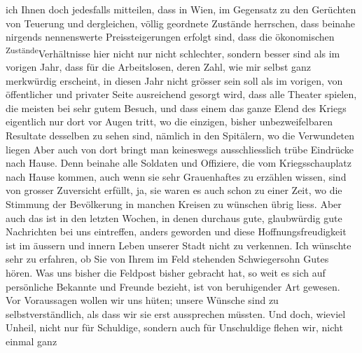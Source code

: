 \begin{ledgroupsized}[t]{13cm}
                    ich Ihnen doch jedesfalls mitteilen, dass in Wien, im Gegensatz zu den Gerüchten von Teuerung und dergleichen,
                    völlig geordnete Zustände herrschen, dass beinahe nirgends nennenswerte
                    Preissteigerungen erfolgt sind, dass die ökonomischen \substVorne{}\textsuperscript{Zustände}{\allowbreak}\substDazwischen{}Verhältnisse\substHinten{} hier nicht nur nicht schlechter, sondern besser sind als im vorigen
                    Jahr, dass für die Arbeitslosen, deren Zahl, wie mir selbst ganz merkwürdig
                    erscheint, in diesen Jahr nicht grösser sein soll als im vorigen, von
                    öffentlicher und privater Seite ausreichend {\pb}gesorgt wird, dass alle Theater spielen, die meisten bei sehr gutem Besuch,
                    und dass einem das ganze Elend des Kriegs eigentlich nur dort vor Augen tritt,
                    wo die einzigen, bisher unbezweifelbaren Resultate desselben zu sehen sind,
                    nämlich in den Spitälern, wo die Verwundeten liegen{\dotstwo}
                    Aber auch von dort bringt man keineswegs ausschliesslich trübe Eindrücke nach
                    Hause. Denn beinahe alle Soldaten und Offiziere, die vom Kriegsschauplatz nach
                    Hause kommen, auch wenn sie sehr Grauenhaftes zu erzählen wissen, sind von
                    grosser Zuversicht erfüllt, ja, sie waren es auch schon zu einer Zeit, wo die
                    Stimmung der Bevölkerung in manchen Kreisen zu wünschen übrig liess. Aber auch
                    das ist in den letzten Wochen, in denen durchaus gute, glaubwürdig gute
                    Nachrichten bei uns eintreffen, anders geworden und diese Hoffnungsfreudigkeit
                    ist im äussern und innern Leben unserer Stadt nicht zu verkennen.\pend
           \pstart
           Ich wünschte sehr zu erfahren, ob {\pb}Sie von
                    Ihrem im Feld stehenden Schwiegersohn Gutes hören. Was uns bisher die Feldpost
                    bisher gebracht hat, so weit es sich auf persönliche Bekannte und
                    Freunde bezieht, ist von beruhigender Art gewesen.\pend
           \pstart
           Vor Voraussagen wollen wir uns hüten; unsere Wünsche sind zu selbstverständlich,
                    als dass wir sie erst aussprechen müssten. Und doch, wieviel Unheil, nicht nur
                    für Schuldige, sondern auch für Unschuldige flehen wir, nicht einmal ganz

\end{ledgroupsized}

